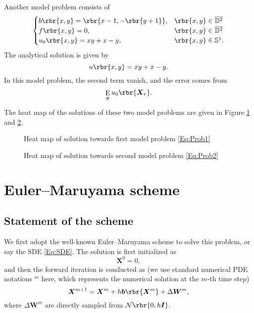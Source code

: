 \documentclass[english, nochinese]{pnote}
\DeclareMathOperator\ope{\mathrm{E}}
\begin{document}
Another model problem consists of
\begin{equation} \label{Eq:Prob2}
\begin{cases}
b \rbr{ x, y } = \rbr{ x - 1, -\rbr{ y + 1 } }, & \rbr{ x, y } \in \overline{\mathbb{D}^2} \\
f \rbr{ x, y } = 0, & \rbr{ x, y } \in \overline{\mathbb{D}^2} \\
u_0 \rbr{ x, y } = x y + x - y, & \rbr{ x, y } \in \mathbb{S}^1.
\end{cases}
\end{equation}
The analytical solution is given by
\begin{equation}
u \rbr{ x, y } = x y + x - y.
\end{equation}
In this model problem, the second term vanish, and the error comes from
\begin{equation}
\ope_{\bm{x}} u_0 \rbr{\bm{X}_{\tau}}.
\end{equation}

The heat map of the solutions of these two model problems are given in Figure \ref{Fig:Heat1} and \ref{Fig:Heat2}.

\begin{figure}[htbp]
\centering

\caption{Heat map of solution towards first model problem \eqref{Eq:Prob1}}
\label{Fig:Heat1}
\end{figure}

\begin{figure}[htbp]
\centering

\caption{Heat map of solution towards second model problem \eqref{Eq:Prob2}}
\label{Fig:Heat2}
\end{figure}

\section{Euler--Maruyama scheme}

\subsection{Statement of the scheme}

We first adopt the well-known Euler--Maruyama scheme to solve this problem, or say the SDE \eqref{Eq:SDE}. The solution is first initialized as
\begin{equation}
\bm{X}^0 = 0,
\end{equation}
and then the forward iteration is conducted as (we use standard numerical PDE notations $^m$ here, which represents the numerical solution at the $m$-th time step)
\begin{equation} \label{Eq:EM}
\bm{X}^{ m + 1 } = \bm{X}^m + h \bm{b} \rbr{\bm{X}^m} + \Delta \bm{W}^m,
\end{equation}
where $ \Delta \bm{W}^m $ are directly sampled from $ \mathcal{N} \rbr{ 0, h \bm{I} } $.
\end{document}
